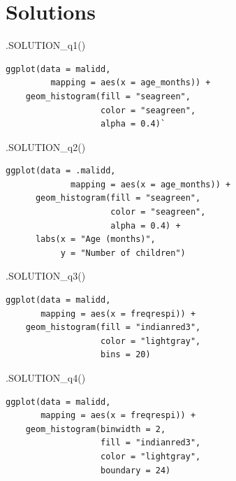 \documentclass[
  letterpaper,
  DIV=11,
  numbers=noendperiod]{scrreprt}
\newenvironment{Shaded}{\begin{snugshade}}{\end{snugshade}}
\newcommand{\FunctionTok}[1]{\textcolor[rgb]{0.28,0.35,0.67}{#1}}
\newcommand{\NormalTok}[1]{\textcolor[rgb]{0.00,0.23,0.31}{#1}}
\begin{document}
\hypertarget{solutions-12}{%
\section{Solutions}\label{solutions-12}}

\begin{Shaded}
\begin{Highlighting}[]
\FunctionTok{.SOLUTION\_q1}\NormalTok{()}
\end{Highlighting}
\end{Shaded}

\begin{verbatim}
ggplot(data = malidd, 
         mapping = aes(x = age_months)) +
    geom_histogram(fill = "seagreen",
                   color = "seagreen",
                   alpha = 0.4)`
\end{verbatim}

\begin{Shaded}
\begin{Highlighting}[]
\FunctionTok{.SOLUTION\_q2}\NormalTok{()}
\end{Highlighting}
\end{Shaded}

\begin{verbatim}
ggplot(data = .malidd, 
             mapping = aes(x = age_months)) +
      geom_histogram(fill = "seagreen",
                     color = "seagreen",
                     alpha = 0.4) +
      labs(x = "Age (months)",
           y = "Number of children")
\end{verbatim}

\begin{Shaded}
\begin{Highlighting}[]
\FunctionTok{.SOLUTION\_q3}\NormalTok{() }
\end{Highlighting}
\end{Shaded}

\begin{verbatim}
ggplot(data = malidd, 
       mapping = aes(x = freqrespi)) +
    geom_histogram(fill = "indianred3",
                   color = "lightgray",
                   bins = 20)
\end{verbatim}

\begin{Shaded}
\begin{Highlighting}[]
\FunctionTok{.SOLUTION\_q4}\NormalTok{()}
\end{Highlighting}
\end{Shaded}

\begin{verbatim}
ggplot(data = malidd, 
       mapping = aes(x = freqrespi)) +
    geom_histogram(binwidth = 2,
                   fill = "indianred3",
                   color = "lightgray",
                   boundary = 24)
\end{verbatim}
\end{document}
